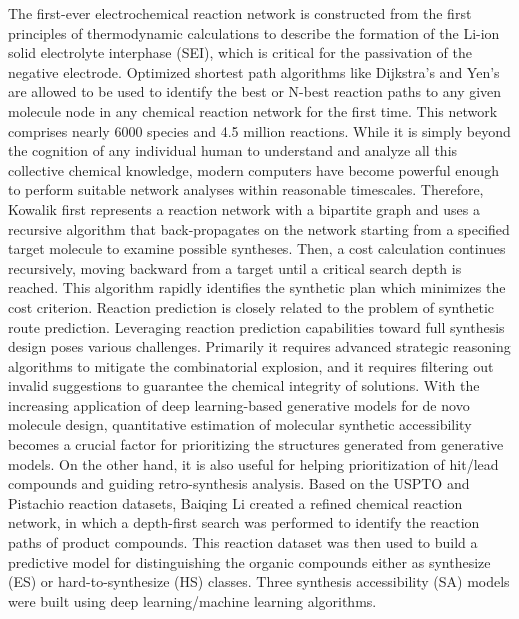 \documentclass[%
 aip,
 jmp,%
 amsmath,amssymb,
 reprint,%
]{revtex4-2}
\begin{document}
The first-ever electrochemical reaction network is constructed from the first principles of thermodynamic calculations to describe the formation of the Li-ion solid electrolyte interphase (SEI)\cite{kim2011effect}, which is critical for the passivation of the negative electrode. Optimized shortest path algorithms like Dijkstra's and Yen's are allowed to be used to identify the best or N-best reaction paths to any given molecule node in any chemical reaction network for the first time\cite{chen2020efficient}. This network comprises nearly 6000 species and 4.5 million reactions\cite{blau2021chemically}.
While it is simply beyond the cognition of any individual human to understand and analyze all this collective chemical knowledge, modern computers have become powerful enough to perform suitable network analyses within reasonable timescales. Therefore, Kowalik first represents a reaction network with a bipartite graph and uses a recursive algorithm that back-propagates on the network starting from a specified target molecule to examine possible syntheses. Then, a cost calculation continues recursively, moving backward from a target until a critical search depth is reached. This algorithm rapidly identifies the synthetic plan which minimizes the cost criterion\cite{kowalik2012parallel}.
Reaction prediction is closely related to the problem of synthetic route prediction\cite{li2019making, andrae2006molecular}. 
Leveraging reaction prediction capabilities toward full synthesis design poses various challenges. 
Primarily it requires advanced strategic reasoning algorithms\cite{seo2014neural} to mitigate the combinatorial explosion, and it requires filtering out invalid suggestions to guarantee the chemical integrity of solutions\cite{ravitz2013data}.
With the increasing application of deep learning-based generative models\cite{kang2021deep} for de novo molecule design\cite{meyers2021novo, schneider2005computer, merk2018novo}, quantitative estimation of molecular synthetic accessibility\cite{lu2012quantitative, huang2011rasa, horwood2020molecular} becomes a crucial factor for prioritizing the structures generated from generative models\cite{theis2015note, salakhutdinov2015learning, kingma2014semi}. On the other hand, it is also useful for helping prioritization of hit/lead compounds and guiding retro-synthesis analysis. Based on the USPTO and Pistachio reaction datasets, Baiqing Li created a refined chemical reaction network, in which a depth-first search was performed to identify the reaction paths of product compounds. This reaction dataset was then used to build a predictive model for distinguishing the organic compounds either as synthesize (ES) or hard-to-synthesize (HS) classes\cite{kim2011effect}. Three synthesis accessibility (SA) models were built using deep learning/machine learning algorithms\cite{li2022prediction}.
\end{document}
